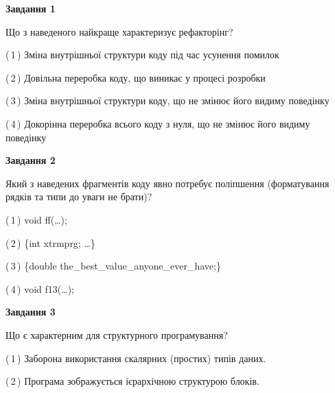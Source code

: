 \documentclass[10pt, ukrainian]{article}
\begin{document}
{
\begin {large}
{\begin {center}\textbf{Завдання 1}\end {center}}\par
Що з наведеного найкраще характеризує рефакторінг?\par
\vspace{2mm}



(\,1\,) Зміна внутрішньої структури коду під час усунення помилок%



(\,2\,) Довільна переробка коду, що виникає у процесі розробки%



(\,3\,) Зміна внутрішньої структури коду, що не змінює його видиму поведінку%



(\,4\,) Докорінна переробка всього коду з нуля,  що не змінює його видиму поведінку%


{\begin {center}\textbf{Завдання 2}\end {center}}\par
Який з наведених фрагментів коду явно потребує поліпшення (форматування рядків та типи до уваги не брати)?\par
\vspace{2mm}



(\,1\,) void ff(…);%



(\,2\,) \{int xtrmprg; …\}%



(\,3\,) \{double the\_best\_value\_anyone\_ever\_have;\} %



(\,4\,) void f13(…);%


{\begin {center}\textbf{Завдання 3}\end {center}}\par
Що є характерним для структурного програмування?\par
\vspace{2mm}



(\,1\,) Заборона використання скалярних (простих) типів даних. %



(\,2\,) Програма зображується ієрархічною структурою блоків.%




\end{large}}
\end{document}

